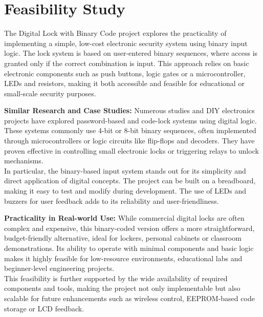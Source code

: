 \section{Feasibility Study}
The Digital Lock with Binary Code project explores the practicality of implementing a simple, low-cost electronic security system using binary input logic. The lock system is based on user-entered binary sequences, where access is granted only if the correct combination is input. This approach relies on basic electronic components such as push buttons, logic gates or a microcontroller, LEDs  and resistors, making it both accessible and feasible for educational or small-scale security purposes.\\
\item \textbf{Similar Research and Case Studies:}
Numerous studies and DIY electronics projects have explored password-based and code-lock systems using digital logic. These systems commonly use 4-bit or 8-bit binary sequences, often implemented through microcontrollers  or logic circuits like flip-flops and decoders. They have proven effective in controlling small electronic locks or triggering relays to unlock mechanisms.\\
In particular, the binary-based input system stands out for its simplicity and direct application of digital concepts. The project can be built on a breadboard, making it easy to test and modify during development. The use of LEDs and buzzers for user feedback adds to its reliability and user-friendliness.
\item \textbf{Practicality in Real-world Use:}
While commercial digital locks are often complex and expensive, this binary-coded version offers a more straightforward, budget-friendly alternative, ideal for lockers, personal cabinets or classroom demonstrations. Its ability to operate with minimal components and basic logic makes it highly feasible for low-resource environments, educational labs  and beginner-level engineering projects.\\
This feasibility is further supported by the wide availability of required components and tools, making the project not only implementable but also scalable for future enhancements such as wireless control, EEPROM-based code storage or LCD feedback.\cite{1.4}

